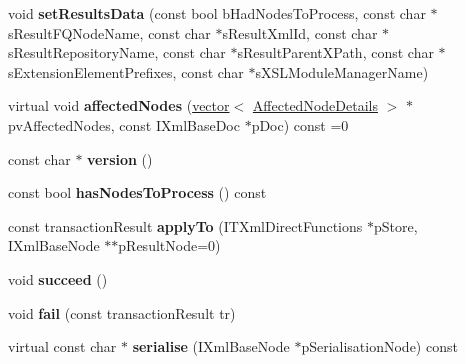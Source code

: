 \begin{DoxyCompactItemize}
\item 
\hypertarget{classgeneral__server_1_1TXml_a8eb90fdf342577b55203a173f3290691}{void {\bfseries set\-Results\-Data} (const bool b\-Had\-Nodes\-To\-Process, const char $\ast$s\-Result\-F\-Q\-Node\-Name, const char $\ast$s\-Result\-Xml\-Id, const char $\ast$s\-Result\-Repository\-Name, const char $\ast$s\-Result\-Parent\-X\-Path, const char $\ast$s\-Extension\-Element\-Prefixes, const char $\ast$s\-X\-S\-L\-Module\-Manager\-Name)}\label{classgeneral__server_1_1TXml_a8eb90fdf342577b55203a173f3290691}

\item 
\hypertarget{classgeneral__server_1_1TXml_a6325a2f1290e8149c506d30fb95e4249}{virtual void {\bfseries affected\-Nodes} (\hyperlink{classvector}{vector}$<$ \hyperlink{structgeneral__server_1_1TXml_1_1AffectedNodeDetails}{\-Affected\-Node\-Details} $>$ $\ast$pv\-Affected\-Nodes, const \-I\-Xml\-Base\-Doc $\ast$p\-Doc) const =0}\label{classgeneral__server_1_1TXml_a6325a2f1290e8149c506d30fb95e4249}

\item 
\hypertarget{classgeneral__server_1_1TXml_af1b2a737314ae9b34b894c6793e47292}{const char $\ast$ {\bfseries version} ()}\label{classgeneral__server_1_1TXml_af1b2a737314ae9b34b894c6793e47292}

\item 
\hypertarget{classgeneral__server_1_1TXml_a324346030193adc988b03f3bdf25fa06}{const bool {\bfseries has\-Nodes\-To\-Process} () const }\label{classgeneral__server_1_1TXml_a324346030193adc988b03f3bdf25fa06}

\item 
\hypertarget{classgeneral__server_1_1TXml_a65c8ec3de9f779a0f5e32b2f8841a044}{const transaction\-Result {\bfseries apply\-To} (\-I\-T\-Xml\-Direct\-Functions $\ast$p\-Store, \-I\-Xml\-Base\-Node $\ast$$\ast$p\-Result\-Node=0)}\label{classgeneral__server_1_1TXml_a65c8ec3de9f779a0f5e32b2f8841a044}

\item 
\hypertarget{classgeneral__server_1_1TXml_a4510050c8b5d136b3218f8d4fbe904f9}{void {\bfseries succeed} ()}\label{classgeneral__server_1_1TXml_a4510050c8b5d136b3218f8d4fbe904f9}

\item 
\hypertarget{classgeneral__server_1_1TXml_aaee3cff868cadf0416c6b44be5838294}{void {\bfseries fail} (const transaction\-Result tr)}\label{classgeneral__server_1_1TXml_aaee3cff868cadf0416c6b44be5838294}

\item 
\hypertarget{classgeneral__server_1_1TXml_a0119eb32f0b805f400a81a42664f2069}{virtual const char $\ast$ {\bfseries serialise} (\-I\-Xml\-Base\-Node $\ast$p\-Serialisation\-Node) const }\label{classgeneral__server_1_1TXml_a0119eb32f0b805f400a81a42664f2069}


\end{DoxyCompactItemize}
